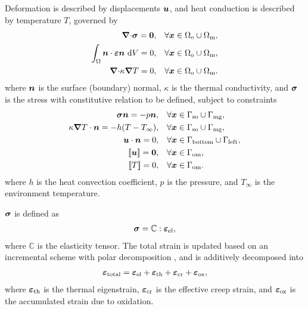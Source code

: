 Deformation is described by displacements $\boldsymbol{u}$, and heat conduction is described by temperature $T$, governed by
\begin{align}
  {\boldsymbol{\nabla}\cdot} \boldsymbol{\sigma} = \boldsymbol{0},                           & \quad \forall \boldsymbol{x} \in \Omega_\text{o} \cup \Omega_\text{m}, \\
  \int_\Omega \boldsymbol{n} \cdot \boldsymbol{\varepsilon} \boldsymbol{n} \text{ d}V = 0, & \quad \forall \boldsymbol{x} \in \Omega_\text{o} \cup \Omega_\text{m}, \\
  {\boldsymbol{\nabla} \cdot} \kappa \boldsymbol{\nabla} T = 0,                         & \quad \forall \boldsymbol{x} \in \Omega_\text{o} \cup \Omega_\text{m}.
\end{align}
where $\boldsymbol{n}$ is the surface (boundary) normal, $\kappa$ is the thermal conductivity, and $\boldsymbol{\sigma}$ is the stress with constitutive relation to be defined, subject to constraints
\begin{align}
  \stress \normal = -p \normal,                   & \quad \forall \bfx \in \Gamma_\text{so} \cup \Gamma_\text{mg},       \\
  \kappa \grad T \cdot \normal = -h (T-T_\infty), & \quad \forall \bfx \in \Gamma_\text{so} \cup \Gamma_\text{mg},       \\
  \bfu \cdot \normal = 0,                         & \quad \forall \bfx \in \Gamma_\text{bottom} \cup \Gamma_\text{left}, \\
  [\![ \bfu ]\!] = \bs{0},                        & \quad \forall \bfx \in \Gamma_\text{om},                             \\
  [\![ T ]\!] = 0,                                & \quad \forall \bfx \in \Gamma_\text{om}.
\end{align}
where $h$ is the heat convection coefficient, $p$ is the pressure, and $T_\infty$ is the environment temperature.

$\boldsymbol{\sigma}$ is defined as
\begin{align}
  \boldsymbol{\sigma} = \mathbb{C} : \boldsymbol{\varepsilon}_\text{el},
\end{align}
where $\mathbb{C}$ is the elasticity tensor. The total strain is updated based on an incremental scheme with polar decomposition \cite{rashid1993incremental}, and is additively decomposed into
\begin{align}
  \boldsymbol{\varepsilon}_\text{total} = \boldsymbol{\varepsilon}_\text{el} + \boldsymbol{\varepsilon}_\text{th} + \boldsymbol{\varepsilon}_\text{cr} + \boldsymbol{\varepsilon}_\text{ox},
\end{align}
where $\boldsymbol{\varepsilon}_\text{th}$ is the thermal eigenstrain, $\boldsymbol{\varepsilon}_\text{cr}$ is the effective creep strain, and $\boldsymbol{\varepsilon}_\text{ox}$ is the accumulated strain due to oxidation.


